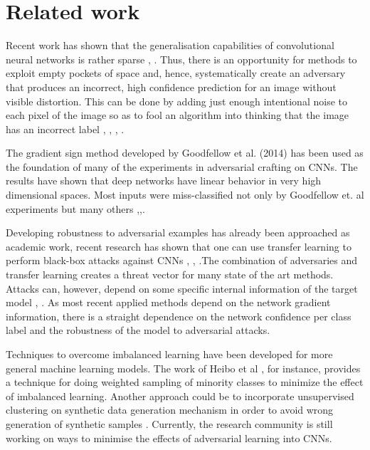 \documentclass[runningheads,a4paper]{llncs}
\begin{document}
\section{Related work}


Recent work has shown that the generalisation capabilities of convolutional neural networks \cite{lawrence1997face} is rather sparse \cite{goodfellow2016}, \cite{papernot2016transf}. Thus, there is an opportunity for methods to exploit empty pockets of space and, hence, systematically create an adversary that produces an incorrect, high confidence prediction for an image without visible distortion. This can be done by adding just enough intentional noise to each pixel of the image so as to fool an algorithm into thinking that the image has an incorrect label \cite{goodfellow2014}, \cite{goodfellow2016}, \cite{papernot2016transf}, \cite{szegedy2013}.

The gradient sign method developed by Goodfellow et al. (2014) has been used as the foundation of many of the experiments in adversarial crafting on CNNs. The results have shown that deep networks have linear behavior in very high dimensional spaces.  Most inputs were miss-classified not only by Goodfellow et. al \cite{goodfellow2014}  experiments but many others \cite{billovits},\cite{goodfellow2016},\cite{papernot2016}.

Developing robustness to adversarial examples has already been approached as academic work, recent research has shown that one can use transfer learning to perform black-box attacks against CNNs \cite{billovits}, \cite{papernot2016}, \cite{yosinski2014transferable} .The combination of adversaries and transfer learning creates a threat vector for many state of the art methods. Attacks can, however, depend on some specific internal information of the target model \cite{lowd2005}, \cite{papernot2016transf}. As most recent applied methods depend on the network gradient information, there is a straight dependence on the network confidence per class label and the robustness of the model to adversarial attacks.

Techniques to overcome imbalanced learning have been developed for more general machine learning models. The work of Heibo et al \cite{he2008adasyn}, for instance, provides a technique for doing weighted sampling of minority classes to minimize the effect of imbalanced learning. Another approach could be to incorporate unsupervised clustering on synthetic data generation mechanism in order to avoid wrong generation of synthetic samples \cite{Barua2011}. Currently, the research community is still working on ways to minimise the effects of adversarial learning into CNNs.
\end{document}
